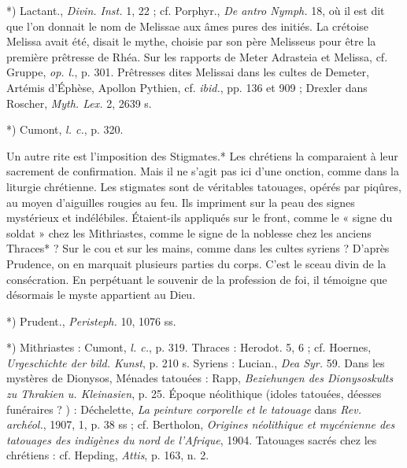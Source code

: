 \documentclass[a4paper, 11pt, oneside, polutonikogreek, french]{article}
\begin{document}
*) Lactant., \emph{Divin. Inst.} 1, 22 ; cf. Porphyr., \emph{De antro Nymph.} 18, où il est dit que l'on donnait le nom de Melissae aux âmes pures des initiés. La crétoise Melissa avait été, disait le mythe, choisie par son père Melisseus pour être la première prêtresse de Rhéa. Sur les rapports de Meter Adrasteia et Melissa, cf. Gruppe, \emph{op. l.}, p. 301. Prêtresses dites Melissai dans les cultes de Demeter, Artémis d'Éphèse, Apollon Pythien, cf. \emph{ibid.}, pp. 136 et 909 ; Drexler dans Roscher, \emph{Myth. Lex.} 2, 2639 s.

*) Cumont, \emph{l. c.}, p. 320.

Un autre rite est l'imposition des Stigmates.* Les chrétiens la comparaient à leur sacrement de confirmation. Mais il ne s'agit pas ici d'une onction, comme dans la liturgie chrétienne. Les stigmates sont de véritables tatouages, opérés par piqûres, au moyen d'aiguilles rougies au feu. Ils impriment sur la peau des signes mystérieux et indélébiles. Étaient-ils appliqués sur le front, comme le « signe du soldat » chez les Mithriastes, comme le signe de la noblesse chez les anciens Thraces* ? Sur le cou et sur les mains, comme dans les cultes syriens ? D'après Prudence, on en marquait plusieurs parties du corps. C'est le sceau divin de la consécration. En perpétuant le souvenir de la profession de foi, il témoigne que désormais le myste appartient au Dieu.

*) Prudent., \emph{Peristeph.} 10, 1076 ss.

*) Mithriastes : Cumont, \emph{l. c.}, p. 319. Thraces : Herodot. 5, 6 ; cf. Hoernes, \emph{Urgeschichte der bild. Kunst}, p. 210 s. Syriens : Lucian., \emph{Dea Syr.} 59. Dans les mystères de Dionysos, Ménades tatouées : Rapp, \emph{Beziehungen des Dionysoskults zu Thrakien u. Kleinasien}, p. 25. Époque néolithique (idoles tatouées, déesses funéraires ? ) : Déchelette, \emph{La peinture corporelle et le tatouage} dans \emph{Rev. archéol.}, 1907, 1, p. 38 ss ; cf. Bertholon, \emph{Origines néolithique et mycénienne des tatouages des indigènes du nord de l'Afrique}, 1904. Tatouages sacrés chez les chrétiens : cf. Hepding, \emph{Attis}, p. 163, n. 2.
\end{document}

